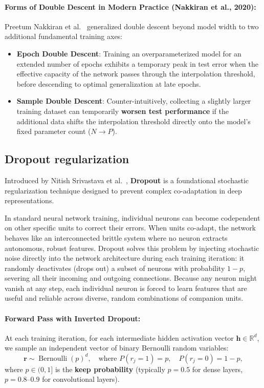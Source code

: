 \paragraph{Forms of Double Descent in Modern Practice (Nakkiran et al., 2020):}
Preetum Nakkiran et al.~\cite{nakkiran2020deep} generalized double descent beyond model width to two additional fundamental training axes:
\begin{itemize}[noitemsep,topsep=2pt,parsep=0pt,partopsep=0pt]
  \item \textbf{Epoch Double Descent}: Training an overparameterized model for an extended number of epochs exhibits a temporary peak in test error when the effective capacity of the network passes through the interpolation threshold, before descending to optimal generalization at late epochs.
  \item \textbf{Sample Double Descent}: Counter-intuitively, collecting a slightly larger training dataset can temporarily \textbf{worsen test performance} if the additional data shifts the interpolation threshold directly onto the model's fixed parameter count ($N \to P$).
\end{itemize}

\subsection{Dropout regularization}
\label{sec:inverted_dropout}

Introduced by Nitish Srivastava et al.~\cite{srivastava2014dropout}, \textbf{Dropout} is a foundational stochastic regularization technique designed to prevent complex co-adaptation in deep representations. 

In standard neural network training, individual neurons can become codependent on other specific units to correct their errors. When units co-adapt, the network behaves like an interconnected brittle system where no neuron extracts autonomous, robust features. Dropout solves this problem by injecting stochastic noise directly into the network architecture during each training iteration: it randomly deactivates (drops out) a subset of neurons with probability $1-p$, severing all their incoming and outgoing connections. Because any neuron might vanish at any step, each individual neuron is forced to learn features that are useful and reliable across diverse, random combinations of companion units.

\paragraph{Forward Pass with Inverted Dropout:}
At each training iteration, for each intermediate hidden activation vector $\mathbf{h} \in \mathbb{R}^d$, we sample an independent vector of binary Bernoulli random variables:
\begin{equation}
\mathbf{r} \sim \operatorname{Bernoulli}(p)^d, \quad \text{where } P(r_j = 1) = p, \quad P(r_j = 0) = 1 - p,
\label{eq:bernoulli_mask}
\end{equation}
where $p \in (0, 1]$ is the \textbf{keep probability} (typically $p = 0.5$ for dense layers, $p = 0.8$--$0.9$ for convolutional layers).

